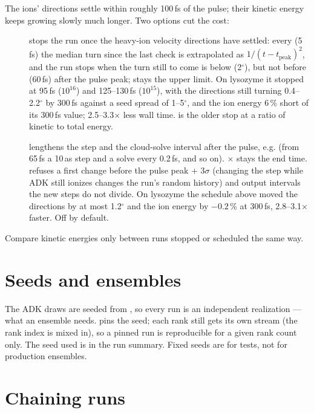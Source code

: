 The ions' directions settle within roughly 100\,fs of the pulse; their kinetic energy keeps growing slowly much longer.
Two options cut the cost:
\begin{description}
  \item[] stops the run once the heavy-ion velocity directions have settled: every
     (5\,fs) the median turn since the last check is extrapolated as $1/(t-t_{\mathrm{peak}})^2$,
    and the run stops when the turn still to come is below  (2$^\circ$), but not before
     (60\,fs) after the pulse peak;  stays the upper limit.
    On lysozyme it stopped at 95\,fs ($10^{16}$) and 125--130\,fs ($10^{15}$), with the directions still turning
    0.4--2.2$^\circ$ by 300\,fs against a seed spread of 1--5$^\circ$, and the ion energy 6\,\% short of its 300\,fs value;
    2.5--3.3$\times$ less wall time.
     is the older stop at a ratio of kinetic to total energy.
  \item[] lengthens the step and the cloud-solve interval after the pulse, e.g.
     (from 65\,fs a 10\,as step and a solve every 0.2\,fs, and so on).
     $\times$  stays the end time.
     refuses a first change before the pulse peak + $3\sigma$ (changing the step while ADK still ionizes
    changes the run's random history) and output intervals the new steps do not divide.
    On lysozyme the schedule above moved the directions by at most 1.2$^\circ$ and the ion energy by $-0.2$\,\% at
    300\,fs, 2.8--3.1$\times$ faster.
    Off by default.
\end{description}
Compare kinetic energies only between runs stopped or scheduled the same way.

\section{Seeds and ensembles}
\label{sec:seeds}

The ADK draws are seeded from , so every run is an independent realization --- what an ensemble
needs.
 pins the seed; each rank still gets its own stream (the rank index is mixed in), so a pinned
run is reproducible for a given rank count only.
The seed used is in the run summary.
Fixed seeds are for tests, not for production ensembles.

\section{Chaining runs}

